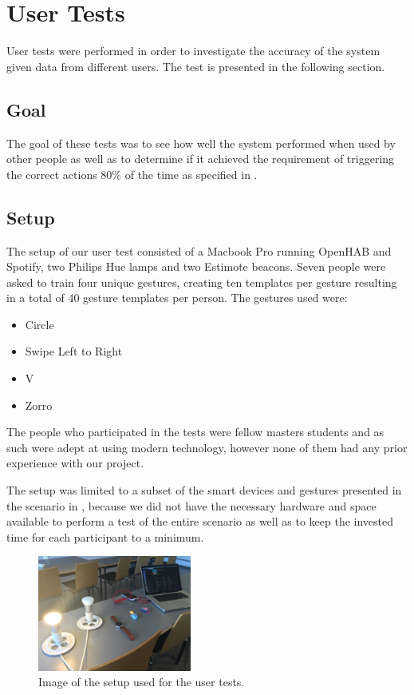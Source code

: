 \section{User Tests}
\label{sec:evaluation:user-tests}

User tests were performed in order to investigate the accuracy of the system given data from different users. The test is presented in the following section.

\subsection{Goal}

The goal of these tests was to see how well the system performed when used by other people as well as to determine if it achieved the requirement of triggering the correct actions 80\% of the time as specified in .

\subsection{Setup}
\label{sec:evaluation:user-tests-setup}

The setup of our user test consisted of a Macbook Pro running OpenHAB and Spotify, two Philips Hue lamps and two Estimote beacons.
Seven people were asked to train four unique gestures, creating ten templates per gesture resulting in a total of 40 gesture templates per person.
The gestures used were:

\begin{itemize}
  \item Circle
  \item Swipe Left to Right
  \item V
  \item Zorro
\end{itemize}

The people who participated in the tests were fellow masters students and as such were adept at using modern technology, however none of them had any prior experience with our project.

The setup was limited to a subset of the smart devices and gestures presented in the scenario in , because we did not have the necessary hardware and space available to perform a test of the entire scenario as well as to keep the invested time for each participant to a minimum.

\begin{figure}[h]
\centering
\includegraphics[width=0.45\textwidth]{images/user-test-setup.jpg}
\caption{Image of the setup used for the user tests.}
\label{fig:user-test-setup-image}
\end{figure}

